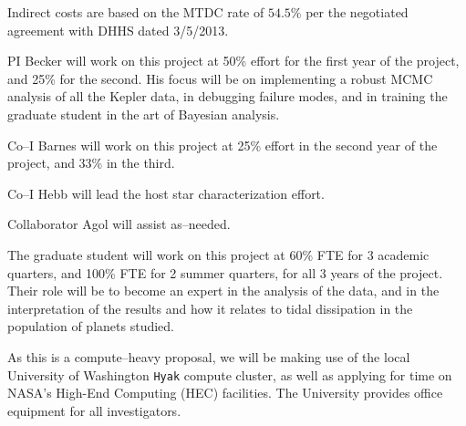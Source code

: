 Indirect costs are based on the MTDC rate of $54.5\%$ per the
negotiated agreement with DHHS dated 3/5/2013.

\pagebreak

\bigskip {}

PI Becker will work on this project at 50\% effort for the first
year of the project, and 25\% for the second.  His focus will be on
implementing a robust MCMC analysis of all the Kepler data, in
debugging failure modes, and in training the graduate student in the
art of Bayesian analysis.

Co--I Barnes will work on this project at 25\% effort in the second
year of the project, and 33\% in the third.

Co--I Hebb will lead the host star characterization effort.

Collaborator Agol will assist as--needed.

The graduate student will work on this project at 60\% FTE for 3
academic quarters, and 100\% FTE for 2 summer quarters, for all 3
years of the project. Their role will be to become an expert in the
analysis of the data, and in the interpretation of the results and how
it relates to tidal dissipation in the population of planets studied.

\bigskip {}

As this is a compute--heavy proposal, we will be making use of the
local University of Washington {\tt Hyak} compute cluster, as well as
applying for time on NASA's High-End Computing (HEC) facilities.  The
University provides office equipment for all investigators.
